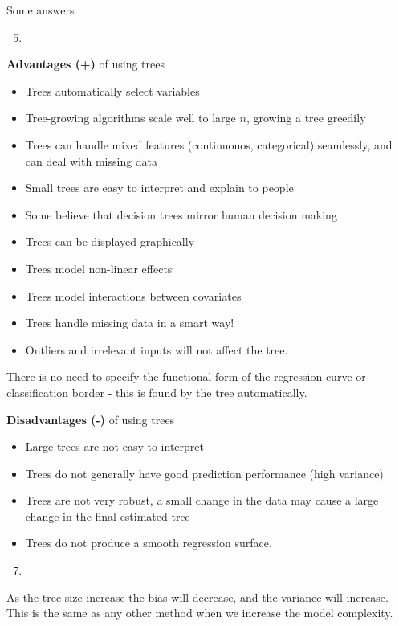 \documentclass[
  ignorenonframetext,
]{beamer}
\providecommand{\tightlist}{%
  \setlength{\itemsep}{0pt}\setlength{\parskip}{0pt}}
\begin{document}
\begin{frame}

\begin{block}{Some answers}

\begin{enumerate}
[1)]
\setcounter{enumi}{4}
\item
\end{enumerate}

\textbf{Advantages (+)} of using trees

\begin{itemize}
\tightlist
\item
  Trees automatically select variables
\item
  Tree-growing algorithms scale well to large \(n\), growing a tree
  greedily
\item
  Trees can handle mixed features (continuouos, categorical) seamlessly,
  and can deal with missing data
\item
  Small trees are easy to interpret and explain to people
\item
  Some believe that decision trees mirror human decision making
\item
  Trees can be displayed graphically
\item
  Trees model non-linear effects
\item
  Trees model interactions between covariates
\item
  Trees handle missing data in a smart way!
\item
  Outliers and irrelevant inputs will not affect the tree.
\end{itemize}

There is no need to specify the functional form of the regression curve
or classification border - this is found by the tree automatically.

\end{block}

\end{frame}

\begin{frame}

\textbf{Disadvantages (-)} of using trees

\begin{itemize}
\tightlist
\item
  Large trees are not easy to interpret
\item
  Trees do not generally have good prediction performance (high
  variance)
\item
  Trees are not very robust, a small change in the data may cause a
  large change in the final estimated tree
\item
  Trees do not produce a smooth regression surface.
\end{itemize}

\begin{enumerate}
[1)]
\setcounter{enumi}{6}
\item
\end{enumerate}

As the tree size increase the bias will decrease, and the variance will
increase. This is the same as any other method when we increase the
model complexity.

\end{frame}
\end{document}
